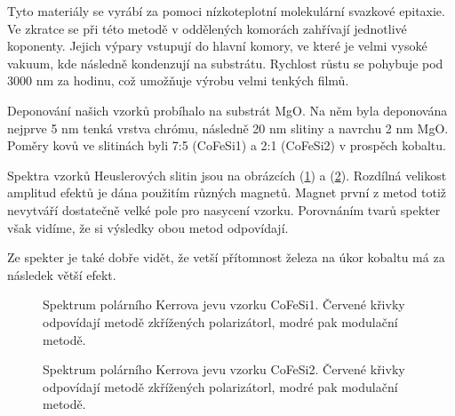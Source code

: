 Tyto materiály se vyrábí za pomoci nízkoteplotní molekulární svazkové epitaxie. Ve zkratce se při této 
metodě v oddělených komorách zahřívají jednotlivé koponenty. Jejich výpary vstupují do hlavní komory, ve které je velmi vysoké vakuum, kde následně kondenzují na substrátu. 
Rychlost růstu se pohybuje pod 3000 nm za hodinu, což umožňuje výrobu velmi tenkých filmů.

Deponování našich vzorků probíhalo na substrát MgO. Na něm byla deponována nejprve 5 nm tenká vrstva chrómu, následně 20 nm slitiny a navrchu 2 nm MgO. Poměry kovů ve slitinách byli 7:5 (CoFeSi1) a 2:1 (CoFeSi2) v prospěch kobaltu.

Spektra vzorků Heuslerových slitin jsou na obrázcích (\ref{sCoFeSi1}) a (\ref{sCoFeSi2}). Rozdílná velikost amplitud efektů je dána použitím různých magnetů. 
Magnet první z metod totiž nevytváří dostatečně velké pole pro nasycení vzorku. Porovnáním tvarů spekter však vidíme, že si výsledky obou metod odpovídají.

Ze spekter je také dobře vidět, že vetší přítomnost železa na úkor kobaltu má za následek větší efekt.

\begin{figure}

\caption{Spektrum polárního Kerrova jevu vzorku CoFeSi1. Červené křivky odpovídají metodě zkřížených polarizátorl, modré pak modulační metodě.}
\label{sCoFeSi1}
\end{figure}

\begin{figure}

\caption{Spektrum polárního Kerrova jevu vzorku CoFeSi2. Červené křivky odpovídají metodě zkřížených polarizátorl, modré pak modulační metodě.}
\label{sCoFeSi2}
\end{figure}
